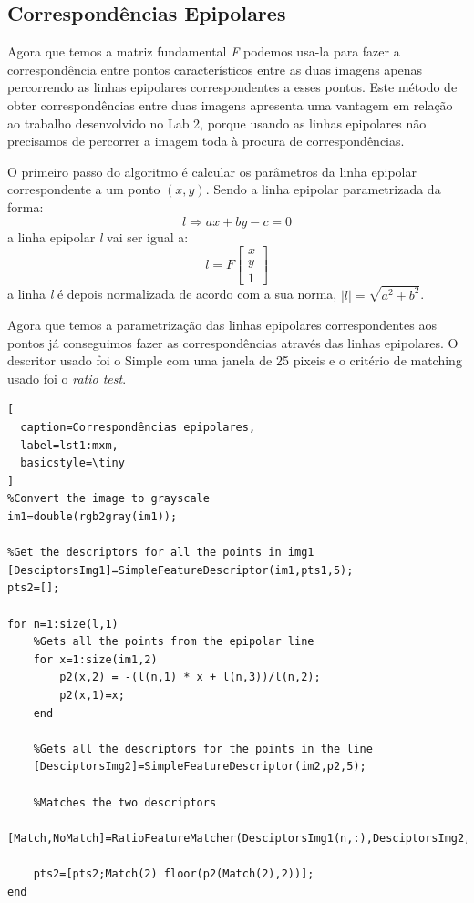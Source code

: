 \documentclass[journal]{IEEEtran}
\begin{document}
\subsection*{Correspondências Epipolares}
\par Agora que temos a matriz fundamental \textit{F} podemos usa-la para fazer a correspondência entre pontos característicos entre as duas imagens apenas percorrendo as linhas epipolares correspondentes a esses pontos. Este método de obter correspondências entre duas imagens apresenta uma vantagem em relação ao trabalho desenvolvido no Lab 2, porque usando as linhas epipolares não precisamos de percorrer a imagem toda à procura de correspondências.
\par O primeiro passo do algoritmo é calcular os parâmetros da linha epipolar correspondente a um ponto $(x,y)$. Sendo a linha epipolar parametrizada da forma:
\begin{equation}
   l\Rightarrow ax+by-c=0
\end{equation}
a linha epipolar \textit{l} vai ser igual a:
\begin{equation}
    l=F\begin{bmatrix}
    x\\y\\1
    \end{bmatrix}
\end{equation}
a linha \textit{l} é depois normalizada de acordo com a sua norma, $|l|=\sqrt{a^2+b^2}$.
\par Agora que temos a parametrização das linhas epipolares correspondentes aos  pontos já conseguimos fazer as correspondências através das linhas epipolares. O descritor usado foi o Simple com uma janela de 25 pixeis e o critério de matching usado foi o \textit{ratio test}.
\begin{lstlisting}[
  caption=Correspondências epipolares,
  label=lst1:mxm,
  basicstyle=\tiny
]
%Convert the image to grayscale
im1=double(rgb2gray(im1));

%Get the descriptors for all the points in img1
[DesciptorsImg1]=SimpleFeatureDescriptor(im1,pts1,5);
pts2=[];

for n=1:size(l,1)  
    %Gets all the points from the epipolar line
    for x=1:size(im1,2)
        p2(x,2) = -(l(n,1) * x + l(n,3))/l(n,2);
        p2(x,1)=x;
    end
    
    %Gets all the descriptors for the points in the line
    [DesciptorsImg2]=SimpleFeatureDescriptor(im2,p2,5); 
    
    %Matches the two descriptors
    [Match,NoMatch]=RatioFeatureMatcher(DesciptorsImg1(n,:),DesciptorsImg2,10); 
    
    pts2=[pts2;Match(2) floor(p2(Match(2),2))];
end
\end{lstlisting}
\end{document}
